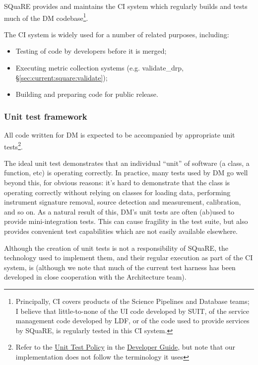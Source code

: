 \documentclass[DM,authoryear,toc,lsstdraft]{lsstdoc}
\begin{document}
SQuaRE provides and maintains the CI system which regularly builds and
tests much of the DM codebase\footnote{Principally, CI covers products of
the Science Pipelines and Database teams; I believe that little-to-none of the
UI code developed by SUIT, of the service management code developed by LDF, or
of the code used to provide services by SQuaRE, is regularly tested in this CI
system.}.

The CI system is widely used for a number of related purposes, including:

\begin{itemize}

  \item{Testing of code by developers before it is merged;}
  \item{Executing metric collection systems (e.g. validate\_drp,
  \S\ref{sec:current:square:validate});}
  \item{Building and preparing code for public release.}

\end{itemize}

\subsubsection{Unit test framework}
\label{sec:current:square:unit}

All code written for DM is expected to be accompanied by appropriate unit
tests\footnote{Refer to the
\href{https://developer.lsst.io/coding/unit_test_policy.html}{Unit Test
Policy} in the \href{https://developer.lsst.io}{Developer Guide}, but note
that our implementation does not follow the terminology it uses}.

The ideal unit test demonstrates that an individual ``unit'' of software (a
class, a function, etc) is operating correctly. In practice, many tests used
by DM go well beyond this, for obvious reasons: it's hard to demonstrate that
the  class is operating correctly without relying on
classes for loading data, performing instrument signature removal, source
detection and measurement, calibration, and so on. As a natural result of
this, DM's unit tests are often (ab)used to provide mini-integration tests.
This can cause fragility in the test suite, but also provides convenient
test capabilities which are not easily available elsewhere.

Although the creation of unit tests is not a responsibility of SQuaRE, the
technology used to implement them, and their regular execution as part of the
CI system, is (although we note that much of the current test harness has been
developed in close cooperation with the Architecture team).
\end{document}
